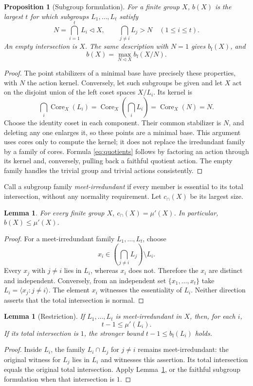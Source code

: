 \documentclass[11pt]{article}
\newtheorem{proposition}[theorem]{Proposition}
\newtheorem{lemma}[theorem]{Lemma}
\theoremstyle{remark}\newtheorem{remark}[theorem]{Remark}
\newcommand{\mup}{\mu'}
\newcommand{\bfth}{b_{\mathrm f}}
\newcommand{\Core}{\operatorname{Core}}
\newcommand{\rankcap}{c_{\cap}}
\begin{document}
\begin{proposition}[Subgroup formulation]
For a finite group $X$, $b(X)$ is the largest $t$ for which subgroups
$L_1,\ldots,L_t$ satisfy
\[
 N=\bigcap_{i=1}^t L_i\lhd X,
 \qquad
 \bigcap_{j\ne i}L_j>N\quad(1\le i\le t).
\]
An empty intersection is $X$. The same description with $N=1$ gives
$\bfth(X)$, and
\begin{equation}\label{eq:quotients}
 b(X)=\max_{N\lhd X}\bfth(X/N).
\end{equation}
\end{proposition}
\begin{proof}
The point stabilizers of a minimal base have precisely these properties, with
$N$ the action kernel. Conversely, let such subgroups be given and let $X$ act
on the disjoint union of the left coset spaces $X/L_i$. Its kernel is
\[
 \bigcap_i\Core_X(L_i)
 =\Core_X\!\left(\bigcap_iL_i\right)=\Core_X(N)=N.
\]
Choose the identity coset in each component. Their common stabilizer is $N$,
and deleting any one enlarges it, so these points are a minimal base. This
argument uses cores only to compute the kernel; it does not replace the
irredundant family by a family of cores. Formula \eqref{eq:quotients} follows
by factoring an action through its kernel and, conversely, pulling back a
faithful quotient action. The empty family handles the trivial group and
trivial actions consistently.
\end{proof}

Call a subgroup family \emph{meet-irredundant} if every member is essential to
its total intersection, without any normality requirement. Let $\rankcap(X)$
be its largest size.

\begin{lemma}\label{lem:breadth}
For every finite group $X$, $\rankcap(X)=\mup(X)$. In particular,
$b(X)\le\mup(X)$.
\end{lemma}
\begin{proof}
For a meet-irredundant family $L_1,\ldots,L_t$, choose
\[
 x_i\in\left(\bigcap_{j\ne i}L_j\right)\setminus L_i.
\]
Every $x_j$ with $j\ne i$ lies in $L_i$, whereas $x_i$ does not. Therefore the
$x_i$ are distinct and independent. Conversely, from an independent set
$\{x_1,\ldots,x_t\}$ take $L_i=\langle x_j:j\ne i\rangle$. The element $x_i$
witnesses the essentiality of $L_i$. Neither direction asserts that the total
intersection is normal.
\end{proof}

\begin{lemma}[Restriction]\label{lem:restriction}
If $L_1,\ldots,L_t$ is meet-irredundant in $X$, then, for each $i$,
\[
 t-1\le\mup(L_i).
\]
If its total intersection is $1$, the stronger bound
$t-1\le\bfth(L_i)$ holds.
\end{lemma}
\begin{proof}
Inside $L_i$, the family $L_i\cap L_j$ for $j\ne i$ remains meet-irredundant:
the original witness for $L_j$ lies in $L_i$ and witnesses this assertion.
Its total intersection equals the original total intersection. Apply
Lemma~\ref{lem:breadth}, or the faithful subgroup formulation when that
intersection is $1$.
\end{proof}
\end{document}
